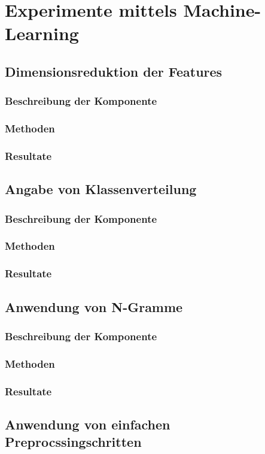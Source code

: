 \section{Experimente mittels Machine-Learning}
\subsection{Dimensionsreduktion der Features}
\subsubsection{Beschreibung der Komponente}
\subsubsection{Methoden}
\subsubsection{Resultate}
\subsection{Angabe von Klassenverteilung}
\subsubsection{Beschreibung der Komponente}
\subsubsection{Methoden}
\subsubsection{Resultate}
\subsection{Anwendung von N-Gramme}
\subsubsection{Beschreibung der Komponente}
\subsubsection{Methoden}
\subsubsection{Resultate}
\subsection{Anwendung von einfachen Preprocssingschritten}
